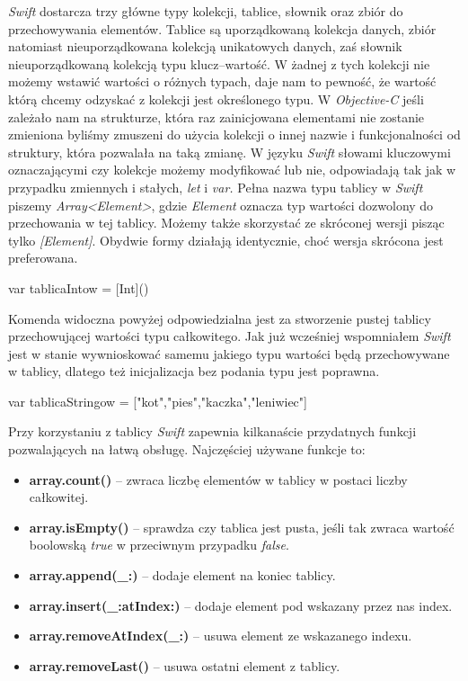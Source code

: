 \documentclass{iiuwb}
\begin{document}
\textit{Swift} dostarcza trzy główne typy kolekcji, tablice, słownik oraz zbiór do przechowywania elementów. Tablice są uporządkowaną kolekcja danych, zbiór natomiast nieuporządkowana kolekcją unikatowych danych, zaś słownik nieuporządkowaną kolekcją typu klucz--wartość. W żadnej z tych kolekcji nie możemy wstawić wartości o różnych typach, daje nam to pewność, że wartość którą chcemy odzyskać z kolekcji jest określonego typu. 
W \textit{Objective-C} jeśli zależało nam na strukturze, która raz zainicjowana elementami nie zostanie zmieniona byliśmy zmuszeni do użycia kolekcji o innej nazwie i funkcjonalności od struktury, która pozwalała na taką zmianę. W języku \textit{Swift} słowami kluczowymi oznaczającymi czy kolekcje możemy modyfikować lub nie, odpowiadają tak jak w przypadku zmiennych i stałych, \textit{let} i \textit{var.}
Pełna nazwa typu tablicy w \textit{Swift} piszemy \textit{Array<Element>}, gdzie \textit{Element} oznacza typ wartości dozwolony do przechowania w tej tablicy. Możemy także skorzystać ze skróconej wersji pisząc tylko \textit{[Element]}. Obydwie formy działają identycznie, choć wersja skrócona jest preferowana. 
\begin{center}
	var tablicaIntow = [Int]()
\end{center}
Komenda widoczna powyżej odpowiedzialna jest za stworzenie pustej tablicy przechowującej wartości typu całkowitego. Jak już wcześniej wspomniałem \textit{Swift} jest w stanie wywnioskować samemu jakiego typu wartości będą przechowywane w tablicy, dlatego też inicjalizacja bez podania typu jest poprawna.
\begin{center}
	var tablicaStringow = ["kot","pies","kaczka","leniwiec"]
\end{center}
Przy korzystaniu z tablicy \textit{Swift} zapewnia kilkanaście przydatnych funkcji pozwalających na łatwą obsługę. Najczęściej używane funkcje to:
\begin{itemize}
\item \textbf{array.count()} -- zwraca liczbę elementów w tablicy w postaci liczby całkowitej.
\item \textbf{array.isEmpty()} -- sprawdza czy tablica jest pusta, jeśli tak zwraca wartość boolowską \textit{true} w przeciwnym przypadku \textit{false}.
\item \textbf{array.append(\_:)} -- dodaje element na koniec tablicy.
\item \textbf{array.insert(\_:atIndex:)} -- dodaje element pod wskazany przez nas index.
\item \textbf{array.removeAtIndex(\_:)} -- usuwa element ze wskazanego indexu.
\item \textbf{array.removeLast()} -- usuwa ostatni element z tablicy.
\end{itemize}
\end{document}
